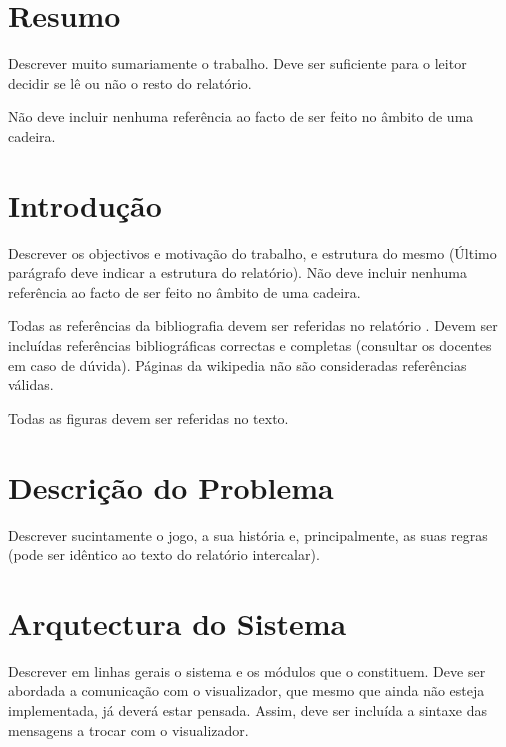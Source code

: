 \documentclass[15pt,a4paper]{article}
\begin{document}
\newpage

\section*{Resumo}
Descrever muito sumariamente o trabalho. Deve ser suficiente para o leitor decidir se lê ou não o resto do relatório.

Não deve incluir nenhuma referência ao facto de ser feito no âmbito de uma cadeira.

\newpage

\tableofcontents



\newpage

\section{Introdução}
Descrever os objectivos e motivação do trabalho, e estrutura do mesmo (Último parágrafo deve indicar a estrutura do relatório). Não deve incluir nenhuma referência ao facto de ser feito no âmbito de uma cadeira.

Todas as referências da bibliografia devem ser referidas no relatório \cite{CodigoSite, CodigoLivro}. Devem ser incluídas referências bibliográficas correctas e completas (consultar os docentes em caso de dúvida). Páginas da wikipedia não são consideradas referências válidas.

Todas as figuras devem ser referidas no texto. 

\section{Descrição do Problema}
Descrever sucintamente o jogo, a sua  história e,  principalmente, as suas regras (pode ser idêntico ao texto do relatório intercalar).

\section{Arqutectura do Sistema}
Descrever em linhas gerais o sistema e os módulos que o constituem. Deve ser abordada a comunicação com o visualizador, que mesmo que ainda não esteja implementada, já deverá estar pensada. Assim, deve ser incluída a sintaxe das mensagens a trocar com o visualizador.
\end{document}
